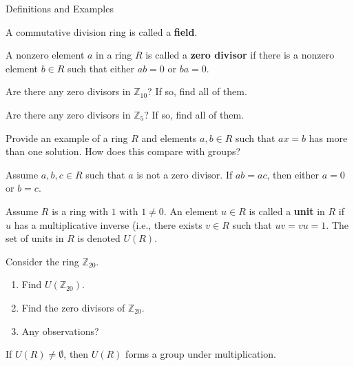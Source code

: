 \begin{section}{Definitions and Examples}
\begin{definition}
A commutative division ring is called a \textbf{field}.
\end{definition}

\begin{definition}
A nonzero element $a$ in a ring $R$ is called a \textbf{zero divisor} if there is a nonzero element $b\in R$ such that either $ab=0$ or $ba=0$.
\end{definition}

\begin{exercise}
Are there any zero divisors in $\mathbb{Z}_{10}$?  If so, find all of them.
\end{exercise}

\begin{exercise}
Are there any zero divisors in $\mathbb{Z}_5$?  If so, find all of them.
\end{exercise}

\begin{exercise}
Provide an example of a ring $R$ and elements $a,b\in R$ such that $ax=b$ has more than one solution.  How does this compare with groups?
\end{exercise}

\begin{theorem}\label{thm:RingCancellation}
Assume $a,b,c\in R$ such that $a$ is not a zero divisor.  If $ab=ac$, then either $a=0$ or $b=c$.
\end{theorem}

\begin{definition}
Assume $R$ is a ring with $1$ with $1\neq 0$. An element $u\in R$ is called a \textbf{unit} in $R$ if $u$ has a multiplicative inverse (i.e., there exists $v\in R$ such that $uv=vu=1$.  The set of units in $R$ is denoted $U(R)$.
\end{definition}

\begin{exercise}
Consider the ring $\mathbb{Z}_{20}$.
\begin{enumerate}[label=\rm{(\alph*)}]
\item Find $U(\mathbb{Z}_{20})$.
\item Find the zero divisors of $\mathbb{Z}_{20}$.
\item Any observations?
\end{enumerate}
\end{exercise}

\begin{theorem}
If $U(R)\neq\emptyset$, then $U(R)$ forms a group under multiplication.
\end{theorem}


\end{section}
